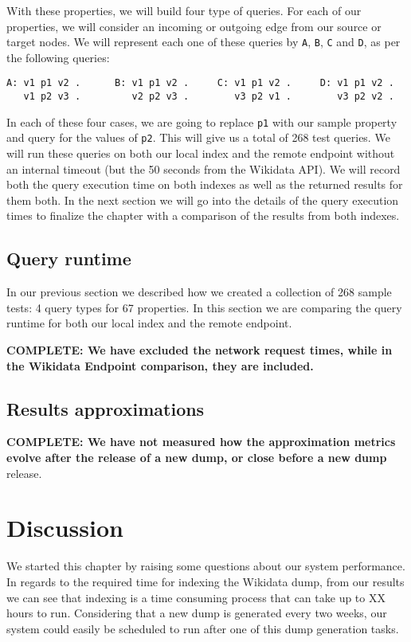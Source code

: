 With these properties, we will build four type of queries. For each of our properties, we will consider an incoming or outgoing edge from our source or target nodes. We will represent each one of these queries by \texttt{A}, \texttt{B}, \texttt{C} and \texttt{D}, as per the following queries: 

\begin{verbatim}
A: v1 p1 v2 .      B: v1 p1 v2 .     C: v1 p1 v2 .     D: v1 p1 v2 .
   v1 p2 v3 .         v2 p2 v3 .        v3 p2 v1 .        v3 p2 v2 .
\end{verbatim}

In each of these four cases, we are going to replace \texttt{p1} with our sample property and query for the values of \texttt{p2}. This will give us a total of 268 test queries. We will run these queries on both our local index and the remote endpoint without an internal timeout (but the 50 seconds from the Wikidata API). We will record both the query execution time on both indexes as well as the returned results for them both. In the next section we will go into the details of the query execution times to finalize the chapter with a comparison of the results from both indexes.

\subsection{Query runtime}

In our previous section we described how we created a collection of 268 sample tests: 4 query types for 67 properties. In this section we are comparing the query runtime for both our local index and the remote endpoint.

\textbf{COMPLETE: We have excluded the network request times, while in the Wikidata Endpoint comparison, they are included.}

\subsection{Results approximations}

\textbf{COMPLETE: We have not measured how the approximation metrics evolve after the release of a new dump, or close before a new dump} release.

\section{Discussion}

We started this chapter by raising some questions about our system performance. In regards to the required time for indexing the Wikidata dump, from our results we can see that indexing is a time consuming process that can take up to XX hours to run. Considering that a new dump is generated every two weeks, our system could easily be scheduled to run after one of this dump generation tasks.

